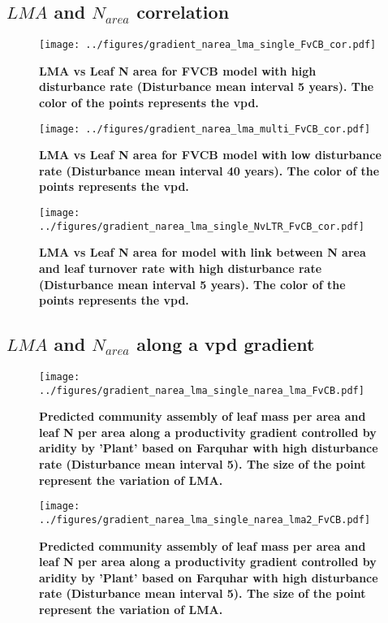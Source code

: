 \documentclass[a4paper,11pt]{article}
\begin{document}
\clearpage

\subsection{$LMA$ and $N_{area}$ correlation}

\begin{figure}[ht]
\centering
\texttt{[image: ../figures/gradient\_narea\_lma\_single\_FvCB\_cor.pdf]}
\caption{\textbf{LMA vs Leaf N area for FVCB model with high disturbance rate (Disturbance mean interval 5 years). The color of the points represents the vpd.}
\label{fig:lma_narea_cor_single}}
\end{figure}


\begin{figure}[ht]
\centering
\texttt{[image: ../figures/gradient\_narea\_lma\_multi\_FvCB\_cor.pdf]}
\caption{\textbf{LMA vs Leaf N area for FVCB model with low disturbance rate (Disturbance mean interval 40 years). The color of the points represents the vpd.}
\label{fig:lma_narea_cor_multi}}
\end{figure}


\begin{figure}[ht]
\centering
\texttt{[image: ../figures/gradient\_narea\_lma\_single\_NvLTR\_FvCB\_cor.pdf]}
\caption{\textbf{LMA vs Leaf N area for model with link between N area and leaf turnover rate with high disturbance rate (Disturbance mean interval 5 years). The color of the points represents the vpd.}
\label{fig:lma_narea_cor_single_NvLTR}}
\end{figure}

\clearpage

\subsection{$LMA$ and $N_{area}$ along a vpd gradient}

\begin{figure}[ht]
\centering
\texttt{[image: ../figures/gradient\_narea\_lma\_single\_narea\_lma\_FvCB.pdf]}
\caption{\textbf{Predicted community assembly of leaf mass per area and leaf N per area along a productivity gradient controlled by aridity by 'Plant' based on Farquhar with high disturbance rate (Disturbance mean interval 5). The size of the point represent the variation of LMA.}
\label{fig:lma_nareaFh}}
\end{figure}

\begin{figure}[ht]
\centering
\texttt{[image: ../figures/gradient\_narea\_lma\_single\_narea\_lma2\_FvCB.pdf]}
\caption{\textbf{Predicted community assembly of leaf mass per area and leaf N per area along a productivity gradient controlled by aridity by 'Plant' based on Farquhar with high disturbance rate (Disturbance mean interval 5). The size of the point represent the variation of LMA.}
\label{fig:lma_nareaFh2}}
\end{figure}
\end{document}
